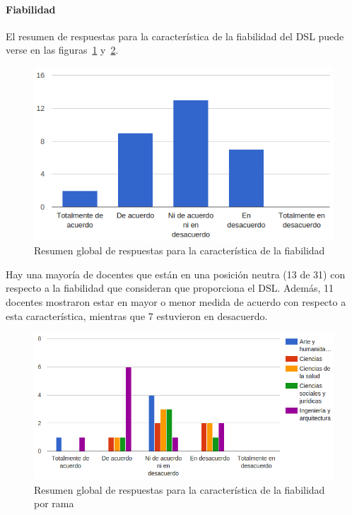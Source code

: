 \newpage
\paragraph*{Fiabilidad}

El resumen de respuestas para la característica de la fiabilidad del DSL puede verse en las figuras~\ref{fig:evalmetodo:dsl:fiabilidad} y~\ref{fig:evalmetodo:dsl:fiabilidad:rama}.

\begin{figure}[h]
  \begin{center}
    \includegraphics[scale=0.5]{C_DSL_fiabilidad.png}
  \end{center}
  \caption{Resumen global de respuestas para la característica de la fiabilidad}
  \label{fig:evalmetodo:dsl:fiabilidad}
\end{figure}

Hay una mayoría de docentes que están en una posición neutra (13 de 31) con respecto a la fiabilidad que consideran que proporciona el DSL. Además, 11 docentes mostraron estar en mayor o menor medida de acuerdo con respecto a esta característica, mientras que 7 estuvieron en desacuerdo. 

\begin{figure}[h]
  \begin{center}
    \includegraphics[scale=0.5]{C_DSL_fiabilidad_rama.png}
  \end{center}
  \caption{Resumen global de respuestas para la característica de la fiabilidad por rama}
  \label{fig:evalmetodo:dsl:fiabilidad:rama}
\end{figure}
    

